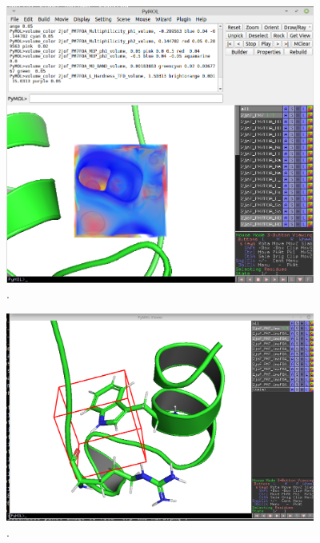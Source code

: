 \documentclass[a4paper,11pt]{refart}
\begin{document}
\hspace*{-\leftmarginwidth}
\begin{minipage}{\fullwidth}
	\begin{figure}[H]
		\begin{center}
			\includegraphics[width=4in]{images/tut3_img24}
			\caption{.}
			\label{fig_tut3_23}
		\end{center}
	\end{figure}
\end{minipage}

\hspace*{-\leftmarginwidth}
\begin{minipage}{\fullwidth}
	\begin{figure}[H]
		\begin{center}
			\includegraphics[width=4in]{images/tut3_img25}
			\caption{.}
			\label{fig_tut3_24}
		\end{center}
	\end{figure}
\end{minipage}
\end{document}
